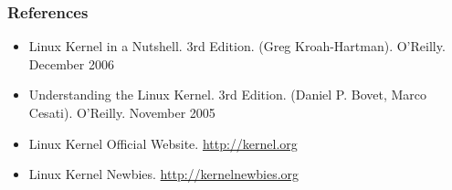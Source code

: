 \documentclass{beamer}
\begin{document}
\begin{frame} 
\frametitle{References}

\begin{itemize}
\item Linux Kernel in a Nutshell. 3rd Edition. (Greg Kroah-Hartman). O'Reilly. December 2006
\item Understanding the Linux Kernel. 3rd Edition. (Daniel P. Bovet, Marco Cesati). O'Reilly. November 2005
\item Linux Kernel Official Website. \url{http://kernel.org}
\item Linux Kernel Newbies. \url{http://kernelnewbies.org}
\end{itemize}

\end{frame}



\end{document}
